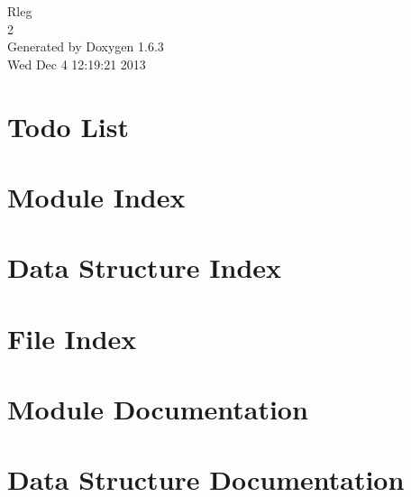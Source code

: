 \documentclass[a4paper]{book}
\begin{document}
\hypersetup{pageanchor=false}
\begin{titlepage}
\vspace*{7cm}
\begin{center}
{\Large Rleg \\[1ex]\large 2 }\\
\vspace*{1cm}
{\large Generated by Doxygen 1.6.3}\\
\vspace*{0.5cm}
{\small Wed Dec 4 12:19:21 2013}\\
\end{center}
\end{titlepage}
\clearemptydoublepage
{}
\tableofcontents
\clearemptydoublepage
{}
\hypersetup{pageanchor=true}
\chapter{Todo List}
\label{todo}
\hypertarget{todo}{}

\chapter{Module Index}

\chapter{Data Structure Index}

\chapter{File Index}

\chapter{Module Documentation}









\chapter{Data Structure Documentation}




















\end{document}
